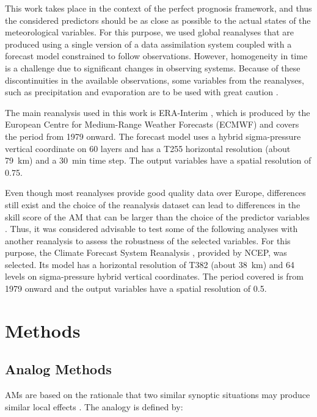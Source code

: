 \documentclass[draft]{agujournal2019}
\begin{document}
This work takes place in the context of the perfect prognosis framework, and thus the considered predictors should be as close as possible to the actual states of the meteorological variables. For this purpose, we used global reanalyses that are produced using a single version of a data assimilation system coupled with a forecast model constrained to follow observations. However, homogeneity in time is a challenge due to significant changes in observing systems. Because of these discontinuities in the available observations, some variables from the reanalyses, such as precipitation and evaporation are to be used with great caution \cite{Kobayashi2015}.

The main reanalysis used in this work is ERA-Interim \cite<ERA-I,>{Dee2011a}, which is produced by the European Centre for Medium-Range Weather Forecasts (ECMWF) and covers the period from 1979 onward. The forecast model uses a hybrid sigma-pressure vertical coordinate on 60 layers and has a T255 horizontal resolution (about 79~km) and a 30~min time step. The output variables have a spatial resolution of 0.75\degree.

Even though most reanalyses provide good quality data over Europe, differences still exist and the choice of the reanalysis dataset can lead to differences in the skill score of the AM that can be larger than the choice of the predictor variables \cite{Horton2018b}. Thus, it was considered advisable to test some of the following analyses with another reanalysis to assess the robustness of the selected variables. For this purpose, the Climate Forecast System Reanalysis \cite<CFSR,>{Saha2010a}, provided by NCEP, was selected. Its model has a horizontal resolution of T382 (about 38~km) and 64 levels on sigma-pressure hybrid vertical coordinates. The period covered is from 1979 onward and the output variables have a spatial resolution of 0.5\degree.


\section{Methods}
\label{methods}

\subsection{Analog Methods}
\label{ams}

AMs are based on the rationale that two similar synoptic situations may produce similar local effects \cite{Lorenz1956, Lorenz1969}. The analogy is defined by:
\end{document}
